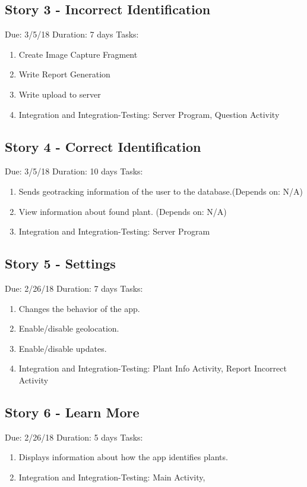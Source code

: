 \documentclass[a4paper]{article}
\begin{document}
\subsection{Story 3 - Incorrect Identification}
Due: 3/5/18
\newline
Duration: 7 days 
\newline
Tasks:
\begin{enumerate}
\item Create Image Capture Fragment
\item Write Report Generation
\item Write upload to server
\item Integration and Integration-Testing: Server Program, Question Activity
\end{enumerate}
\subsection{Story 4 - Correct Identification}
Due: 3/5/18
\newline
Duration: 10 days 
\newline
Tasks:
\begin{enumerate}
\item Sends geotracking information of the user to the database.(Depends on: N/A)
\item View information about found plant. (Depends on: N/A)
\item Integration and Integration-Testing: Server Program
\end{enumerate}
\subsection{Story 5 - Settings}
Due: 2/26/18
\newline
Duration: 7 days 
\newline
Tasks:
\begin{enumerate}
\item Changes the behavior of the app.
\item Enable/disable geolocation.
\item Enable/disable updates.
\item Integration and Integration-Testing: Plant Info Activity, Report Incorrect Activity
\end{enumerate}
\subsection{Story 6 - Learn More}
Due: 2/26/18
\newline
Duration: 5 days 
\newline
Tasks:
\begin{enumerate}
\item Displays information about how the app identifies plants.
\item Integration and Integration-Testing: Main Activity, 
\end{enumerate}
\end{document}
